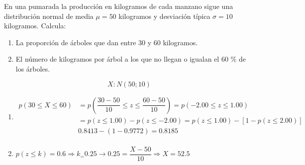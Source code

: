 \begin{exercise}
  En una pumarada la producción en  kilogramos de cada manzano sigue una distribución normal de media $\mu = 50$ kilogramos y desviación típica $ \sigma = 10$ kilogramos. Calcula:
  \begin{enumerate}[label=\alph* )]
  \item La proporción de árboles que dan entre 30 y 60 kilogramos.
  \item El número de kilogramos por árbol a los que no llegan o igualan el 60 \% de los árboles.
  \end{enumerate}

  \tcblower

  \[ X:N(50;10) \]

  \begin{enumerate}[label=\alph* )]
  \item
  \begin{align*}
  p(30 \leq X \leq 60) & = p \left( \dfrac{30-50}{10} \leq z \leq \dfrac{60-50}{10} \right) = p (-2.00 \leq z \leq 1.00) \\
  & = p(z \leq 1.00)-p(z \leq -2.00)=p(z \leq 1.00)-[1-p(z \leq 2.00)] \\
  & 0.8413-(1-0.9772) = 0.8185 \\
  \end{align*}
  \item

  $p(z \leq k )=0.6 \Rightarrow k_ = 0.25 \rightarrow 0.25 = \dfrac{X-50}{10} \Rightarrow X = 52.5$
  \end{enumerate}
\end{exercise}

